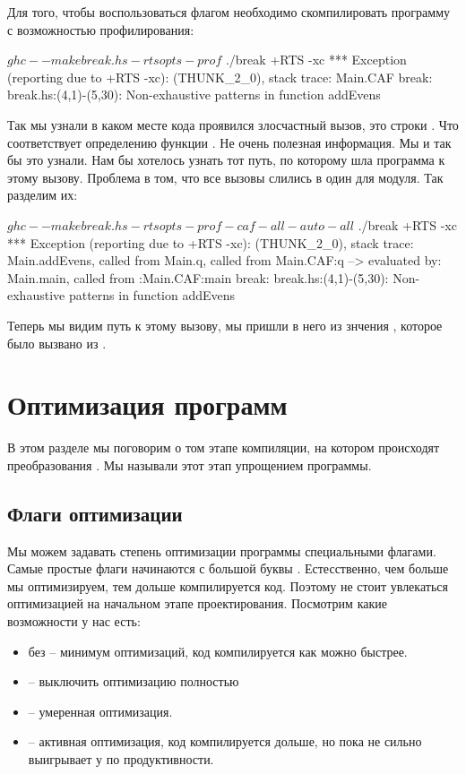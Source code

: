 Для того, чтобы воспользоваться флагом  необходимо
скомпилировать программу с возможностью профилирования:

\begin{code}
$ ghc --make break.hs -rtsopts -prof
$ ./break +RTS -xc
*** Exception (reporting due to +RTS -xc): (THUNK_2_0), stack trace: 
  Main.CAF
break: break.hs:(4,1)-(5,30): Non-exhaustive patterns in function addEvens
\end{code}
  
Так мы узнали в каком месте кода проявился злосчастный вызов, это
строки . Что соответствует определению 
функции . Не очень полезная информация. Мы и так
бы это узнали. Нам бы хотелось узнать тот путь, по которому
шла программа к этому вызову. Проблема в том, что все вызовы
слились в один  для модуля. Так разделим их:

\begin{code}
$ ghc --make break.hs -rtsopts -prof -caf-all -auto-all
$ ./break +RTS -xc
*** Exception (reporting due to +RTS -xc): (THUNK_2_0), stack trace: 
  Main.addEvens,
  called from Main.q,
  called from Main.CAF:q
  --> evaluated by: Main.main,
  called from :Main.CAF:main
break: break.hs:(4,1)-(5,30): Non-exhaustive patterns in function addEvens
\end{code}
  
Теперь мы видим путь к этому вызову, мы пришли в него из 
знчения , которое было вызвано из .

\section{Оптимизация программ}

В этом разделе мы поговорим о том этапе компиляции, на
котором происходят преобразования . 
Мы называли этот этап упрощением программы.

\subsection{Флаги оптимизации}

Мы можем задавать степень оптимизации программы 
специальными флагами. Самые простые флаги начинаются
с большой буквы . Естесственно, чем больше мы оптимизируем,
тем дольше компилируется код. Поэтому не стоит увлекаться 
оптимизацией на начальном этапе проектирования.
Посмотрим какие возможности у нас есть:

\begin{itemize}
\item без  -- минимум оптимизаций, код компилируется как можно быстрее.
\item {} -- выключить оптимизацию полностью
\item {} -- умеренная оптимизация.
\item {} -- активная оптимизация, код компилируется дольше, но
    пока  не сильно выигрывает у  по продуктивности. 
\end{itemize}

